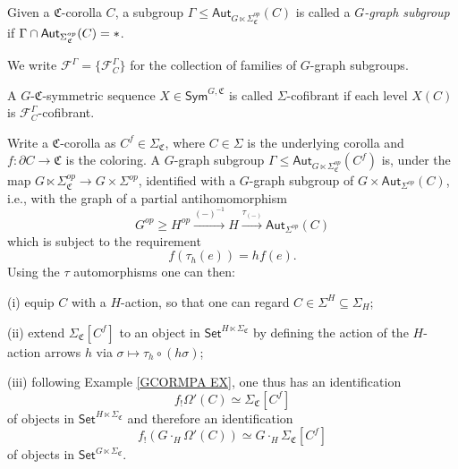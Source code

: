 \documentclass[a4paper,10pt
,draft
]{article}%
\renewcommand{\1}{\eta}%
\begin{document}
\begin{definition}
	Given a $\mathfrak{C}$-corolla $C$, 
	a subgroup 
	$\Gamma \leq \mathsf{Aut}_{G \ltimes \Sigma_{\mathfrak{C}}^{op}}(C)$
	is called a \textit{$G$-graph subgroup} if
	$\Gamma \cap \mathsf{Aut}_{\Sigma_{\mathfrak{C}}^{op}}(C) = \**$.
	
	We write $\mathcal{F}^{\Gamma} = \{\mathcal{F}^{\Gamma}_C\}$
	for the collection of families of $G$-graph subgroups.
	
	A $G$-$\mathfrak{C}$-symmetric sequence
	$X \in \mathsf{Sym}^{G,\mathfrak{C}}$
	is called $\Sigma$-cofibrant if each level
	$X(C)$ is $\mathcal{F}^{\Gamma}_C$-cofibrant.
\end{definition}


\begin{remark}
	Write a $\mathfrak{C}$-corolla as $C^f \in \Sigma_{\mathfrak{C}}$,
	where $C \in \Sigma$ is the underlying corolla and
	$f\colon \partial C \to \mathfrak{C}$
	is the coloring.
	A $G$-graph subgroup 
	$\Gamma \leq \mathsf{Aut}_{G \ltimes \Sigma_{\mathfrak{C}}^{op}}(C^f)$ is, under the map 
	$G \ltimes \Sigma_{\mathfrak{C}}^{op} \to
	G \times \Sigma^{op}$,
	identified with a 
	$G$-graph subgroup of 
	$G \times \mathsf{Aut}_{\Sigma^{op}}(C)$,
	i.e., with the graph of a partial antihomomorphism
\[
	G^{op} \geq H^{op} \xrightarrow{(-)^{-1}} H 
	\xrightarrow{\tau_{(-)}} \mathsf{Aut}_{\Sigma^{op}}(C)
\]
	which is subject to the requirement
\[
	f(\tau_h(e)) = h f(e).
\]
Using the $\tau$ automorphisms one can then:
\begin{inparaenum}
\item[(i)] equip $C$ with a $H$-action,
so that one can regard $C \in \Sigma^H \subseteq \Sigma_H$;
\item[(ii)] extend $\Sigma_{\mathfrak{C}}[C^f]$ to 
an object in $\mathsf{Set}^{H \ltimes \Sigma_{\mathfrak{C}}}$
by defining the action of the $H$-action arrows $h$ via 
$\sigma \mapsto \tau_{h} \circ (h \sigma)$;
\item[(iii)]
following Example \ref{GCORMPA EX}, one thus has an identification
\[
	f_{!} \Omega'(C) \simeq \Sigma_{\mathfrak{C}}[C^f]
\]
of objects in $\mathsf{Set}^{H \ltimes \Sigma_{\mathfrak{C}}}$ and therefore an identification 
\[
	f_{!} \left( G \cdot_H \Omega'(C) \right) \simeq 
	G\cdot_H \Sigma_{\mathfrak{C}}[C^f]
\]
of objects in $\mathsf{Set}^{G \ltimes \Sigma_{\mathfrak{C}}}$.
\end{inparaenum}
\end{remark}
\end{document}
